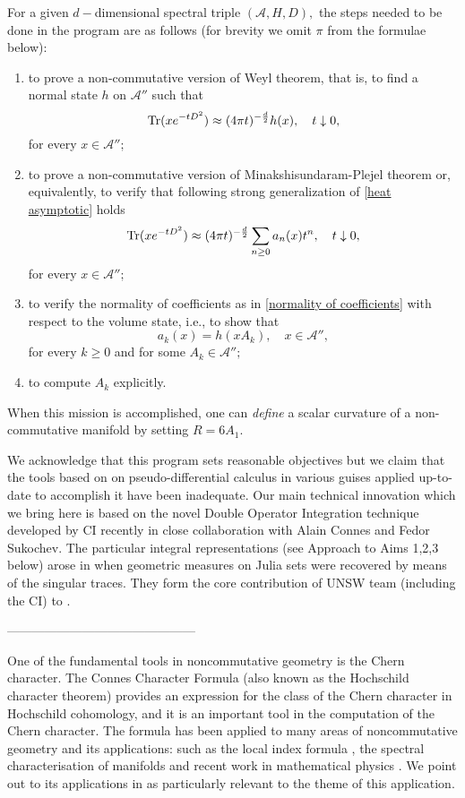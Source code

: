 \documentclass{article}
\begin{document}
For a given $d-$dimensional spectral triple $(\mathcal{A},H,D),$ the steps needed to be done in the program are as follows (for brevity we omit $\pi$ from the formulae below):
\begin{enumerate}
\item\label{raph1} to prove a non-commutative version of Weyl theorem, that is, to find a normal state $h$ on $\mathcal{A}''$ such that  
\begin{equation}\label{raph1 eq}
{\rm Tr}(xe^{-tD^2})\approx (4\pi t)^{-\frac{d}{2}} h(x),\quad t\downarrow0,
\end{equation}
for every $x\in\mathcal{A}'';$
\item\label{raph2} to prove a non-commutative version of Minakshisundaram-Plejel theorem or, equivalently, to verify that following strong generalization of \eqref{heat asymptotic} holds
$${\rm Tr}(xe^{-tD^2})\approx (4\pi t)^{-\frac{d}{2}} \sum_{n\geq0}a_n(x)t^n,\quad t\downarrow0,$$
for every $x\in \mathcal{A}'';$ 
\item\label{raph3} to verify the normality of coefficients as in \eqref{normality of coefficients} with respect to the volume state, i.e., to show that
$$a_k(x)=h(xA_k),\quad x\in\mathcal{A}'',$$
for every $k\geq0$ and for some $A_k\in\mathcal{A}'';$ 
\item\label{raph4} to compute $A_k$ explicitly.
\end{enumerate}
When this mission is accomplished, one can {\it define} a scalar curvature of a non-commutative manifold by setting $R=6A_1.$

We acknowledge that this program sets reasonable objectives but we claim that the tools based on on pseudo-differential calculus in various guises applied up-to-date to accomplish it have been inadequate. Our main technical innovation which we bring here  is based on the novel Double Operator Integration technique developed by CI recently in close collaboration with Alain Connes and Fedor Sukochev. The particular integral representations (see Approach to Aims 1,2,3 below) arose in \cite{Connes_team} when geometric measures on Julia sets were recovered by means of the singular traces. They form the core contribution of UNSW team (including the CI) to \cite{Connes_team}.



---------------------------------------------


One of the fundamental tools in noncommutative geometry is the Chern character. The Connes Character Formula (also known as the Hochschild character theorem) provides an expression for the class of the Chern character in Hochschild cohomology, and it is an important    tool in the computation of the Chern character. The formula has been applied to many areas     of noncommutative geometry and its applications: such as the local index formula \cite{ConnesMoscovici}, the spectral characterisation of manifolds \cite{Connes-reconstruction} and recent work in mathematical physics \cite{Connes-Chamseddine-Mukhanov-quanta-of-geometry-2015}. We point out to its applications in \cite{Connes-reconstruction} as particularly relevant to the theme of this application.
\end{document}
